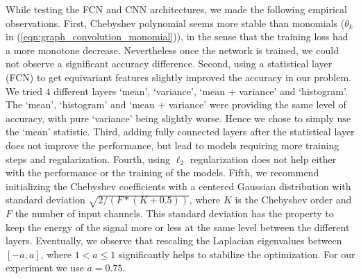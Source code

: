 \documentclass[final,twocolumn,3p,times,authoryear]{elsarticle}
\newcommand{\nati}[1]{{\color[rgb]{.1,.6,.1}{#1}}}
\newcommand{\TK}[1]{{\color{red}{TK:#1}}}
\newcommand{\eqnref}[1]{(\ref{eqn:#1})}
\newcommand{\1}{\b{1}}              %
\newcommand{\0}{\b{0}}              %
\begin{document}

\nati{Michael: I am highly uncertain of what should be kept in the following paragraph. Maybe the full paragraph should be left out!}
While testing the FCN and CNN architectures, we made the following empirical observations.
First, Chebyshev polynomial seems more stable than monomials ($\theta_k$ in \eqnref{graph_convolution_monomial}), in the sense that the training loss had a more monotone decrease.
Nevertheless once the network is trained, we could not observe a significant accuracy difference.
Second, using a statistical layer (FCN) to get equivariant features slightly improved the accuracy in our problem.
We tried $4$ different layers `mean', `variance', `mean + variance' and `histogram'.
The `mean', `histogram' and `mean + variance' were providing the same level of accuracy, with pure `variance' being slightly worse. Hence we chose to simply use the `mean' statistic.
Third, adding fully connected layers after the statistical layer does not improve the performance, but lead to models requiring more training steps and regularization.
Fourth, using $\ell_2$ regularization does not help either with the performance or the training of the models.
Fifth, we recommend initializing the Chebyshev coefficients with a centered Gaussian distribution with standard deviation $\sqrt{2/(F * (K + 0.5))}$, where $K$ is the Chebyshev order and $F$ the number of input channels. This standard deviation has the property to keep the energy of the signal more or less at the same level between the different layers.
Eventually, we observe that rescaling the Laplacian eigenvalues between $[-a,a]$, where $1<a\leq1$ significantly helps to stabilize the optimization. For our experiment we use $a=0.75$.
\end{document}
